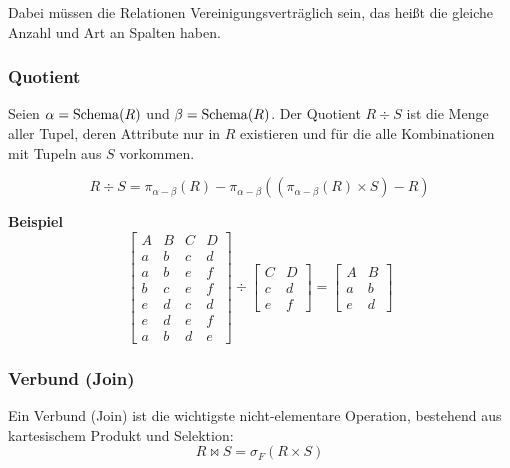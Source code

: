                 Dabei müssen die Relationen Vereinigungsverträglich sein, das heißt die gleiche Anzahl und Art an Spalten haben.

            \subsubsection{Quotient} %
                Seien \( \alpha = \operatorname{Schema}(R) \) und \( \beta = \operatorname{Schema}(R) \). Der Quotient \( R \div S \) ist die Menge aller Tupel, deren Attribute nur in \(R\) existieren und für die alle Kombinationen mit Tupeln aus \(S\) vorkommen.
                
                \begin{equation*}
                    R \div S = \pi_{\alpha - \beta}(R) - \pi_{\alpha - \beta}((\pi_{\alpha-\beta}(R) \times S) - R)
                \end{equation*}
                
                \textbf{Beispiel}
               	\begin{equation*}
                	\begin{bmatrix}
                    	A & B & C & D \\ \hline
                    	a & b & c & d \\
                    	a & b & e & f \\
                    	b & c & e & f \\
                    	e & d & c & d \\
                    	e & d & e & f \\
                    	a & b & d & e
                	\end{bmatrix}
                	\div
                	\begin{bmatrix}
                		C & D \\ \hline
                		c & d \\
                		e & f
                	\end{bmatrix}
                	=
                	\begin{bmatrix}
                    	A & B \\ \hline
                    	a & b \\
                    	e & d
                	\end{bmatrix}
               	\end{equation*}

            \subsubsection{Verbund (Join)} %
                Ein Verbund (Join) ist die wichtigste nicht-elementare Operation, bestehend aus kartesischem Produkt und Selektion:
                \begin{equation*}
                    R \bowtie S = \sigma_F(R \times S)
                \end{equation*}

